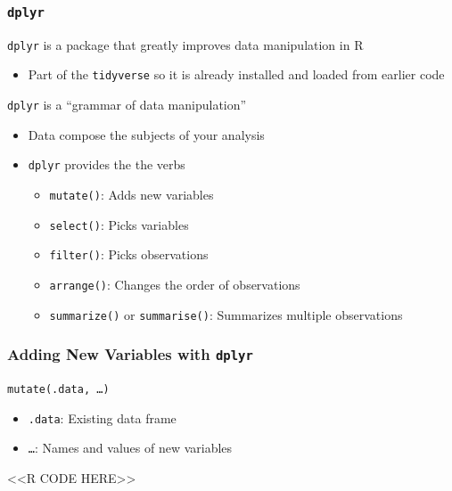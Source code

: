 \documentclass{beamer}
\begin{document}
\begin{frame}\frametitle{\texttt{dplyr}}
    \texttt{dplyr} is a package that greatly improves data manipulation in R
    \begin{itemize}
        \item Part of the \texttt{tidyverse} so it is already installed and loaded from earlier code
    \end{itemize}
    \vspace{3ex}
    \texttt{dplyr} is a ``grammar of data manipulation''
    \begin{itemize}
        \item Data compose the subjects of your analysis
        \item \texttt{dplyr} provides the the verbs
        \begin{itemize}
            \item \texttt{mutate()}: Adds new variables
            \item \texttt{select()}: Picks variables
            \item \texttt{filter()}: Picks observations
            \item \texttt{arrange()}: Changes the order of observations
            \item \texttt{summarize()} or \texttt{summarise()}: Summarizes multiple observations
        \end{itemize}
    \end{itemize}
\end{frame}

\begin{frame}[fragile]\frametitle{Adding New Variables with \texttt{dplyr}}
    \texttt{mutate(.data, \ldots)}
    \begin{itemize}
        \item \texttt{.data}: Existing data frame
        \item \texttt{\ldots}: Names and values of new variables
    \end{itemize}
    <<R CODE HERE>>
\end{frame}
\end{document}
